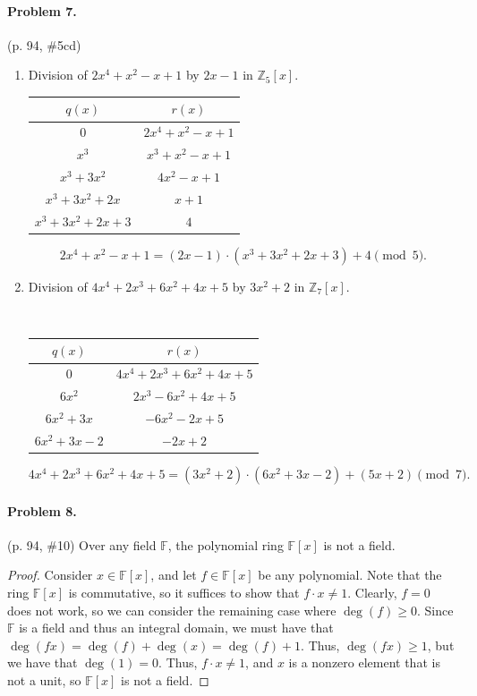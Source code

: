 \documentclass[12pt]{article}
\begin{document}
\paragraph{Problem 7.} (p. 94, \#5cd)

\begin{enumerate}
\item[c.] Division of $2x^4 + x^2 - x + 1$ by $2x-1$ in $\mathbb Z_5[x]$. {
    \begin{tabular}{|c|c|}
        \hline
        $q(x)$ & $r(x)$ \\\hline
        0 & $2x^4 + x^2 - x + 1$ \\\hline
        $x^3$ & $x^3 + x^2 - x + 1$ \\\hline
        $x^3 + 3 x^2$ & $4 x^2 - x + 1$ \\\hline
        $x^3 + 3 x^2 + 2 x$ & $ x + 1$ \\\hline
        $x^3 + 3 x^2 + 2x + 3$ & $4$ \\\hline
    \end{tabular}
    \[2x^4 + x^2 - x + 1 = (2x - 1) \cdot \left(x^3 + 3x^2 + 2x + 3\right) + 4 \pmod 5.\]
}
\item[d.] Division of $4x^4+2x^3+6x^2+4x+5$ by $3x^2+2$ in $\mathbb Z_7[x]$. {
    \\
    \begin{tabular}{|c|c|}
        \hline
        $q(x)$ & $r(x)$ \\\hline
        0 & $4x^4 + 2x^3 + 6x^2 + 4x + 5$ \\\hline
        $6x^2$ & $2x^3 -6 x^2 + 4x + 5$ \\ \hline
        $6x^2 + 3 x$ & $- 6 x^2 - 2 x + 5$ \\ \hline
        $6x^2 + 3x - 2$ & $-2x + 2$ \\ \hline
    \end{tabular}
    \[4x^4 + 2x^3+6x^2+4x+5 = (3x^2 + 2)\cdot (6x^2+3x-2) + (5x+2) \pmod 7.\]
} 
\end{enumerate}

\paragraph{Problem 8.} (p. 94, \#10) Over any field $\mathbb F$, the polynomial ring $\mathbb F[x]$ is not a field.

\begin{proof}
    Consider $x \in \mathbb F[x]$, and let $f \in \mathbb F[x]$ be any polynomial. Note that the ring $\mathbb F[x]$ is commutative, so it suffices to show that $f \cdot x \neq 1$. Clearly, $f = 0$ does not work, so we can consider the remaining case where $\deg(f) \ge 0$. Since $\mathbb F$ is a field and thus an integral domain, we must have that $\deg(fx) = \deg(f) + \deg(x) = \deg(f) + 1$. Thus, $\deg(fx) \ge 1$, but we have that $\deg(1) = 0$. Thus, $f\cdot x \neq 1$, and $x$ is a nonzero element that is not a unit, so $\mathbb F[x]$ is not a field.
\end{proof}
\end{document}
